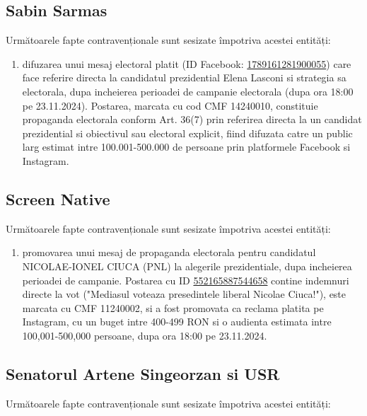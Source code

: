 \documentclass[a4paper,12pt]{article}
\begin{document}
\vspace{0.5cm}

\subsection{Sabin Sarmas}
Următoarele fapte contravenționale sunt sesizate împotriva acestei entități:

\begin{enumerate}[leftmargin=*, label=\arabic*.)]
    \item difuzarea unui mesaj electoral platit (ID Facebook: \href{https://www.facebook.com/ads/library/?id=1789161281900055}{1789161281900055}) care face referire directa la candidatul prezidential Elena Lasconi si strategia sa electorala, dupa incheierea perioadei de campanie electorala (dupa ora 18:00 pe 23.11.2024). Postarea, marcata cu cod CMF 14240010, constituie propaganda electorala conform Art. 36(7) prin referirea directa la un candidat prezidential si obiectivul sau electoral explicit, fiind difuzata catre un public larg estimat intre 100.001-500.000 de persoane prin platformele Facebook si Instagram.
\end{enumerate}

\vspace{0.5cm}

\subsection{Screen Native}
Următoarele fapte contravenționale sunt sesizate împotriva acestei entități:

\begin{enumerate}[leftmargin=*, label=\arabic*.)]
    \item promovarea unui mesaj de propaganda electorala pentru candidatul NICOLAE-IONEL CIUCA (PNL) la alegerile prezidentiale, dupa incheierea perioadei de campanie. Postarea cu ID \href{https://www.facebook.com/ads/library/?id=552165887544658}{552165887544658} contine indemnuri directe la vot ("Mediasul voteaza presedintele liberal Nicolae Ciuca!"), este marcata cu CMF 11240002, si a fost promovata ca reclama platita pe Instagram, cu un buget intre 400-499 RON si o audienta estimata intre 100,001-500,000 persoane, dupa ora 18:00 pe 23.11.2024.
\end{enumerate}

\vspace{0.5cm}

\subsection{Senatorul Artene Singeorzan si USR}
Următoarele fapte contravenționale sunt sesizate împotriva acestei entități:
\end{document}
